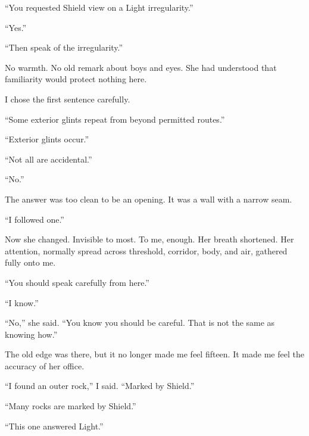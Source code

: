 ``You requested Shield view on a Light irregularity.''\par

``Yes.''\par

``Then speak of the irregularity.''\par

No warmth. No old remark about boys and eyes. She had understood that familiarity would protect nothing here.\par

I chose the first sentence carefully.\par

``Some exterior glints repeat from beyond permitted routes.''\par

``Exterior glints occur.''\par

``Not all are accidental.''\par

``No.''\par

The answer was too clean to be an opening. It was a wall with a narrow seam.\par

``I followed one.''\par

Now she changed. Invisible to most. To me, enough. Her breath shortened. Her attention, normally spread across threshold, corridor, body, and air, gathered fully onto me.\par

``You should speak carefully from here.''\par

``I know.''\par

``No,'' she said. ``You know you should be careful. That is not the same as knowing how.''\par

The old edge was there, but it no longer made me feel fifteen. It made me feel the accuracy of her office.\par

``I found an outer rock,'' I said. ``Marked by Shield.''\par

``Many rocks are marked by Shield.''\par

``This one answered Light.''\par

